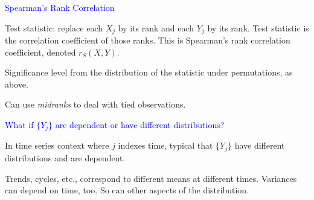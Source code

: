 \documentclass[landscape]{slides}
\begin{document}
\begin{slide}
{\textcolor{blue}{Spearman's Rank Correlation}}

Test statistic: replace each $X_j$ by its rank and each $Y_j$ by its
rank.  Test statistic is the correlation coefficient of those ranks.
This is Spearman's rank correlation coefficient, denoted $r_S(X, Y)$.

Significance level from the distribution of the statistic under
permutations, as above.

Can use {\em midranks\/} to deal with tied observations.

\end{slide}


\begin{slide}
{\textcolor{blue}{What if $\{Y_j\}$ are dependent or have different
distributions?}}

In time series context where $j$ indexes time, typical that
$\{Y_j\}$ have different distributions and are dependent.

Trends, cycles, etc., correspond to different means at different times.
Variances can depend on time, too.
So can other aspects of the distribution.

\end{slide}
\end{document}
